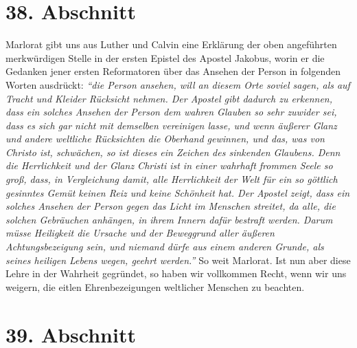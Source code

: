\section{38. Abschnitt} \label{kap9_ab38}

Marlorat gibt uns
aus Luther und Calvin eine
Erklärung der oben
angeführten
merkwürdigen Stelle in der ersten Epistel des Apostel Jakobus, worin er die
Gedanken jener ersten Reformatoren über das Ansehen der Person in folgenden
Worten ausdrückt:
\textit{"`die Person ansehen, will an diesem Orte soviel sagen, als
auf Tracht und Kleider Rücksicht nehmen. Der Apostel gibt dadurch zu erkennen,
dass ein solches Ansehen der Person dem wahren Glauben so sehr zuwider sei, dass
es sich gar nicht mit demselben vereinigen lasse, und wenn äußerer Glanz und
andere weltliche Rücksichten die Oberhand gewinnen, und das, was von Christo
ist, schwächen, so ist dieses ein Zeichen des sinkenden Glaubens. Denn die
Herrlichkeit und der Glanz Christi ist in einer wahrhaft frommen Seele so groß,
dass, in Vergleichung damit, alle Herrlichkeit der Welt für ein so göttlich
gesinntes Gemüt keinen Reiz und keine Schönheit hat. Der Apostel zeigt, dass
ein
solches Ansehen der Person gegen das Licht im Menschen streitet, da alle, die
solchen Gebräuchen anhängen, in ihrem Innern dafür bestraft werden. Darum
müsse Heiligkeit die Ursache und der Beweggrund aller äußeren Achtungsbezeigung
sein, und niemand dürfe aus einem anderen Grunde, als seines heiligen Lebens
wegen, geehrt werden."'} So weit Marlorat. Ist nun aber diese Lehre in der
Wahrheit gegründet, so haben wir vollkommen Recht, wenn wir uns weigern, die
eitlen Ehrenbezeigungen weltlicher Menschen zu beachten.

\section{39. Abschnitt} \label{kap9_ab39}

